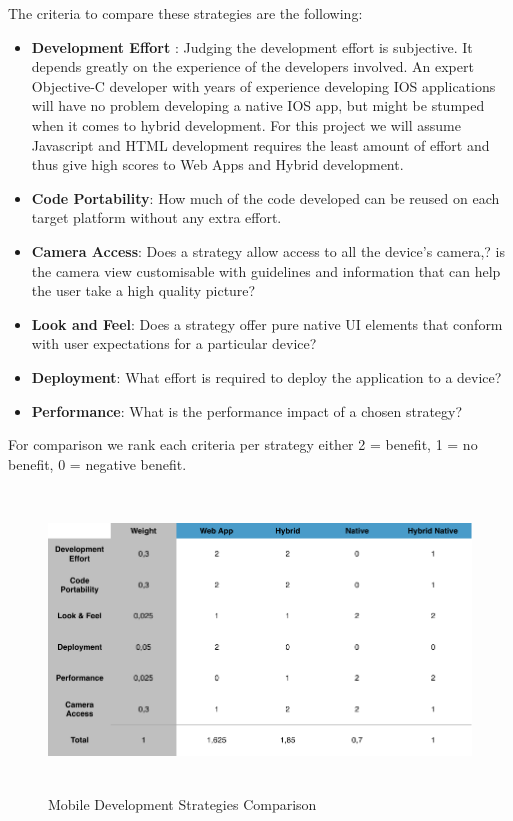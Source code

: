 The criteria to compare these strategies are the following:

\begin{itemize}[label={}]

\item \textbf{Development Effort }: Judging the development effort is subjective. It depends greatly on the experience of the developers involved. An expert Objective-C developer with years of experience developing IOS applications will have no problem developing a native IOS app, but might be stumped when it comes to hybrid development. For this project we will assume Javascript and HTML development requires the least amount of effort and thus give high scores to Web Apps and Hybrid development.

\item \textbf{Code Portability}: How much of the code developed can be reused on each target platform without any extra effort.

\item \textbf{Camera Access}: Does a strategy allow access to all the device’s camera,? is the camera view customisable with guidelines and information that can help the user take a high quality picture?


\item \textbf{Look and Feel}: Does a strategy offer pure native UI elements that conform with user expectations for a particular device?

\item \textbf{Deployment}: What effort is required to deploy the application to a device?

\item \textbf{Performance}: What is the performance impact of a chosen strategy?

\end{itemize}

For comparison we rank each criteria per strategy either 2 = benefit, 1 = no benefit, 0 = negative benefit.

\begin{figure}[H]
    \centering
    \includegraphics[height=8cm,keepaspectratio]{assets/concept/native_vs_hybrid.pdf}
    \caption{Mobile Development Strategies Comparison}
    \label{fig:mob_strat}
\end{figure}

